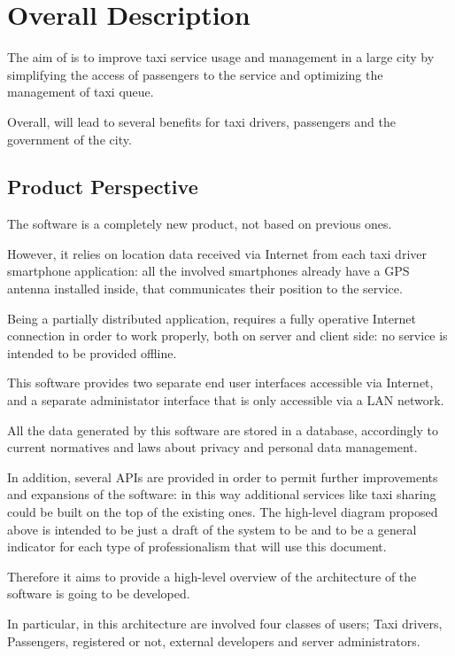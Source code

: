 \section{Overall Description}
The aim of \myTaxiService{} is to improve taxi service usage and management in a large city by simplifying the access of passengers to the service and optimizing the management of taxi queue.\par
Overall, \myTaxiService{} will lead to several benefits for taxi drivers, passengers and the government of the city.
\subsection{Product Perspective}
The software \myTaxiService{} is a completely new product, not based on previous ones.\par
However, it relies on location data received via Internet from each taxi driver smartphone application: all the involved smartphones already have a GPS antenna installed inside, that communicates their position to the service.\par
Being a partially distributed application, \myTaxiService{} requires a fully operative Internet connection in order to work properly, both on server and client side: no service is intended to be provided offline.\par
This software provides two separate end user interfaces accessible via Internet, and a separate administator interface that is only accessible via a LAN network.\par
All the data generated by this software are stored in a database, accordingly to current normatives and laws about privacy and personal data management.\par
In addition, several APIs are provided in order to permit further improvements and expansions of the software: in this way additional services like taxi sharing could be built on the top of the existing ones.
\showGeneralDiagram{}
The high-level diagram proposed above is intended to be just a draft of the system to be and to be a general indicator for each type of professionalism that will use this document.\par
Therefore it aims to provide a high-level overview of the architecture of the software is going to be developed.\par
In particular, in this architecture are involved four classes of users; Taxi drivers, Passengers, registered or not, external developers and server administrators.\par
